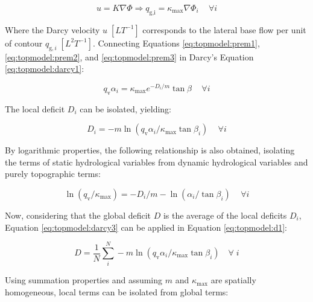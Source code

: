 \documentclass[./main_en.tex]{subfiles}
\begin{document}
\begin{linenomath*}
\begin{equation}
\label{eq:topmodel:darcy1}
u = K \nabla \Phi \Rightarrow q_{\text{g,i}} = \kappa_{\text{max}} \nabla \Phi_{i} \quad \, \forall i
\end{equation}
\end{linenomath*}
Where the Darcy velocity $u \; [LT^{-1}]$ corresponds to the lateral base flow per unit of contour $q_{\text{g}, i}\; [L^{2}T^{-1}]$. Connecting Equations \eqref{eq:topmodel:prem1}, \eqref{eq:topmodel:prem2}, and \eqref{eq:topmodel:prem3} in Darcy's Equation \eqref{eq:topmodel:darcy1}:
\begin{linenomath*}
\begin{equation}
\label{eq:topmodel:darcy2}
q_{\text{v}} \alpha_{i} = \kappa_{\text{max}} e^{-D_{i}/m} \tan \beta  \quad \, \forall i
\end{equation}
\end{linenomath*}
The local deficit $D_i$ can be isolated, yielding:
\begin{linenomath*}
\begin{equation}
\label{eq:topmodel:darcy3}
D_{i} = -m \ln{(q_{\text{v}} \alpha_{i} /\kappa_{\text{max}}\tan \beta_{i})}  \quad \, \forall i
\end{equation}
\end{linenomath*}
By logarithmic properties, the following relationship is also obtained, isolating the terms of static hydrological variables from dynamic hydrological variables and purely topographic terms:
\begin{linenomath*}
\begin{equation}
\label{eq:topmodel:plug1}
\ln(q_{\text{v}}/\kappa_{\text{max}}) = - D_{i}/m - \ln(\alpha_{i} / \tan \beta_{i})  \quad \, \forall i
\end{equation}
\end{linenomath*}
Now, considering that the global deficit $D$ is the average of the local deficits $D_i$, Equation \eqref{eq:topmodel:darcy3} can be applied in Equation \eqref{eq:topmodel:d1}:
\begin{linenomath*}
\begin{equation}
\label{eq:topmodel:d6}
D = \frac{1}{N} \sum^{N}_{i} -m \ln{(q_{\text{v}} \alpha_{i} /\kappa_{\text{max}}\tan \beta_{i})} \quad  \forall \; i 
\end{equation}
\end{linenomath*}
Using summation properties and assuming $m$ and $\kappa_{\text{max}}$ are spatially homogeneous, local terms can be isolated from global terms:
\end{document}

